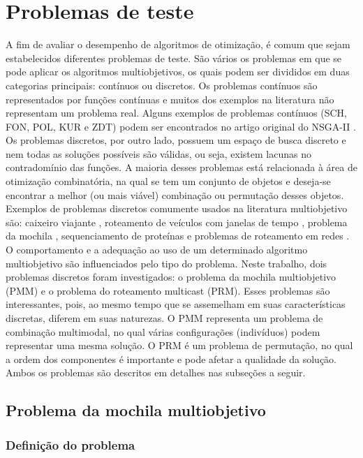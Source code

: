 \chapter[Problemas de teste]{Problemas de teste}

A fim de avaliar o desempenho de algoritmos de otimização, é comum que sejam estabelecidos diferentes problemas de teste. São vários os problemas em que se pode aplicar os algoritmos multiobjetivos, os quais podem ser divididos em duas categorias principais: contínuos ou discretos. Os problemas contínuos são representados por funções contínuas e muitos dos exemplos na literatura não representam um problema real. Alguns exemplos de problemas contínuos (SCH, FON, POL, KUR e ZDT) podem ser encontrados no artigo original do NSGA-II \cite{Deb2002}. Os problemas discretos, por outro lado, possuem um espaço de busca discreto e nem todas as soluções possíveis são válidas, ou seja, existem lacunas no contradomínio das funções. A maioria desses problemas está relacionada à área de otimização combinatória, na qual se tem um conjunto de objetos e deseja-se encontrar a melhor (ou mais viável) combinação ou permutação desses objetos. Exemplos de problemas discretos comumente usados na literatura multiobjetivo são: caixeiro viajante \cite{MTSP}, roteamento de veículos com janelas de tempo \cite{VehicleRouting}, problema da mochila \cite{MKP}, sequenciamento de proteínas \cite{Brasil2013} e problemas de roteamento em redes \cite{Lafeta2017}. O comportamento e a adequação ao uso de um determinado algoritmo multiobjetivo são influenciados pelo tipo do problema. Neste trabalho, dois problemas discretos foram investigados: o problema da mochila multiobjetivo (PMM) e o problema do roteamento multicast (PRM). Esses problemas são interessantes, pois, ao mesmo tempo que se assemelham em suas características discretas, diferem em suas naturezas. O PMM representa um problema de combinação multimodal, no qual várias configurações (indivíduos) podem representar uma mesma solução. O PRM é um problema de permutação, no qual a ordem dos componentes é importante e pode afetar a qualidade da solução. Ambos os problemas são descritos em detalhes nas subseções a seguir.

\section{Problema da mochila multiobjetivo}
\label{section_problemas_pmm}

\subsection{Definição do problema}

